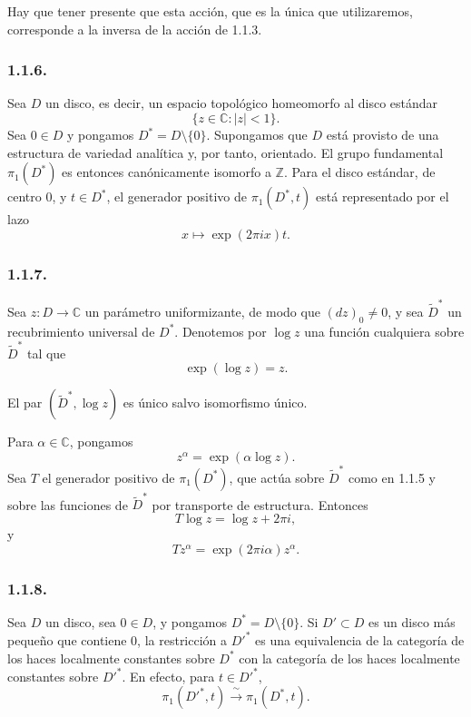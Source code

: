 Hay que tener presente que esta acción, que es la única que utilizaremos,
corresponde a la inversa de la acción de 1.1.3.

\subsubsection*{1.1.6.}
Sea $D$ un disco, es decir, un espacio topológico homeomorfo al disco estándar
\[
\{z\in\mathbb C:|z|<1\}.
\]
Sea $0\in D$ y pongamos $D^*=D\setminus\{0\}$. Supongamos que $D$ está
provisto de una estructura de variedad analítica y, por tanto, orientado. El
grupo fundamental $\pi_1(D^*)$ es entonces canónicamente isomorfo a
$\mathbb Z$. Para el disco estándar, de centro $0$, y $t\in D^*$, el
generador positivo de $\pi_1(D^*,t)$ está representado por el lazo
\[
x\longmapsto \exp(2\pi i x)t.
\]

\subsubsection*{1.1.7.}
Sea $z:D\longrightarrow\mathbb C$ un parámetro uniformizante, de modo que
$(dz)_0\ne0$, y sea $\widetilde D^*$ un recubrimiento universal de $D^*$.
Denotemos por $\log z$ una función cualquiera sobre $\widetilde D^*$ tal que
\[
\exp(\log z)=z.
\]

\pageoriginale

El par $(\widetilde D^*,\log z)$ es único salvo isomorfismo único.

Para $\alpha\in\mathbb C$, pongamos
\[
z^\alpha=\exp(\alpha\log z).
\]
Sea $T$ el generador positivo de $\pi_1(D^*)$, que actúa sobre
$\widetilde D^*$ como en 1.1.5 y sobre las funciones de $\widetilde D^*$ por
transporte de estructura. Entonces
\begin{equation}\tag{1.1.7.1}
T\log z=\log z+2\pi i,
\end{equation}
y
\begin{equation}\tag{1.1.7.2}
Tz^\alpha=\exp(2\pi i\alpha)z^\alpha.
\end{equation}

\subsubsection*{1.1.8.}
Sea $D$ un disco, sea $0\in D$, y pongamos $D^*=D\setminus\{0\}$. Si
$D'\subset D$ es un disco más pequeño que contiene $0$, la restricción a
$D'^*$ es una equivalencia de la categoría de los haces localmente constantes
sobre $D^*$ con la categoría de los haces localmente constantes sobre $D'^*$.
En efecto, para $t\in D'^*$,
\[
\pi_1(D'^*,t)\xrightarrow{\ \sim\ }\pi_1(D^*,t).
\]

